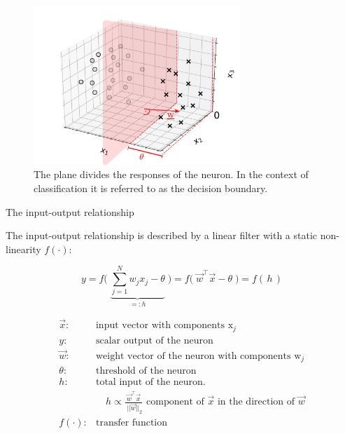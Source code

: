 \begin{frame}
    
    \begin{figure}[h]
        \centering
        \includegraphics[height=6cm]{img/neuron_3d_grid_hyperplane.pdf}
        \caption{The plane divides the responses of the neuron. In the context of classification it is referred to as the decision boundary.}
        \label{fig:neuron_3d_grid_hyperplane}
    \end{figure}
    
\end{frame}
\begin{frame}{The input-output relationship}
    
    The input-output relationship is described by a linear filter with a static non-linearity $f(\cdot)$:

    \begin{equation}
        \label{eq:linearNeuron}
        y = f \Big(\; \underbrace{\sum_{j=1}^{N} {w}_{j} 
            {x}_j - \theta}_{=:h} \; \Big)
            = f \big(\;  \vec{w}^{\top}
            \vec{x}- \theta \; \big)
            = f(\,h\,)
    \end{equation}
    
	\[ \begin{array}{ll} 
		\vec{x}: & \text{input vector with components } \mathrm{x}_j \\
		y: & \text{scalar output of the neuron } \\
		\vec{w}: & \text{weight vector of the neuron with components }
			\mathrm{w}_{j}\\
		\theta: & \text{threshold of the neuron} \\
		h: & \text{total input of the neuron. } \\
		&\quad h \propto \frac{\vec w^\top \vec x}{\;||\vec w||_2} \text{ component of $\vec x$ in the direction of $\vec w$}\\
		f(\cdot): & \text{transfer function}
	\end{array} \]
    
\end{frame}


